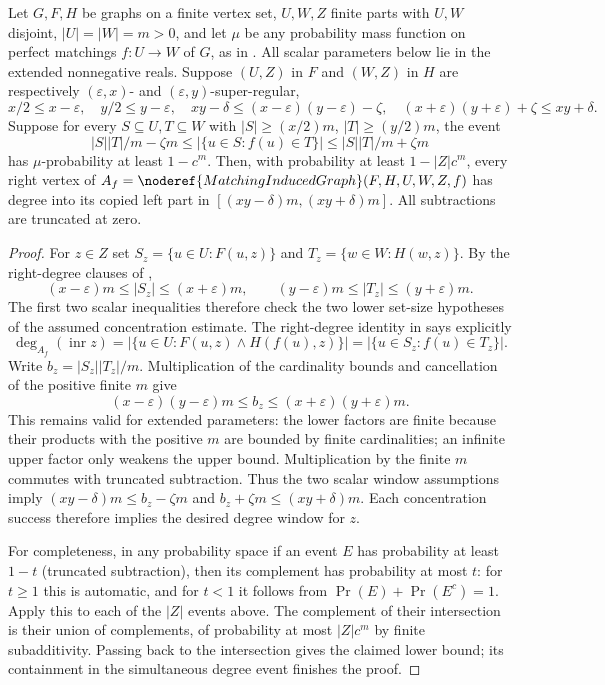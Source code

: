 \begin{lemma}
Let $G,F,H$ be graphs on a finite vertex set, $U,W,Z$ finite parts with $U,W$ disjoint,
$|U|=|W|=m>0$, and let $\mu$ be any probability mass function on perfect
matchings $f:U\to W$ of $G$, as in .
All scalar parameters below lie in the extended nonnegative reals.
Suppose $(U,Z)$ in $F$ and $(W,Z)$ in $H$ are respectively
$(\varepsilon,x)$- and $(\varepsilon,y)$-super-regular,
\[
 x/2\leq x-\varepsilon,\quad y/2\leq y-\varepsilon,\quad
 xy-\delta\leq(x-\varepsilon)(y-\varepsilon)-\zeta,\quad
 (x+\varepsilon)(y+\varepsilon)+\zeta\leq xy+\delta.
\]
Suppose for every $S\subseteq U,T\subseteq W$ with
$|S|\geq(x/2)m$, $|T|\geq(y/2)m$, the event
\[
 |S||T|/m-\zeta m\leq |\{u\in S:f(u)\in T\}|
 \leq |S||T|/m+\zeta m
\]
has $\mu$-probability at least $1-c^m$.
Then, with probability at least $1-|Z|c^m$, every right vertex of
$A_f=\noderef{MatchingInducedGraph}(F,H,U,W,Z,f)$ has degree into its
copied left part in $[(xy-\delta)m,(xy+\delta)m]$.
All subtractions are truncated at zero.
\end{lemma}
\begin{proof}
For $z\in Z$ set $S_z=\{u\in U:F(u,z)\}$ and
$T_z=\{w\in W:H(w,z)\}$. By the right-degree clauses of
,
\[
 (x-\varepsilon)m\leq|S_z|\leq(x+\varepsilon)m,\qquad
 (y-\varepsilon)m\leq|T_z|\leq(y+\varepsilon)m.
\]
The first two scalar inequalities therefore check the two lower set-size
hypotheses of the assumed concentration estimate. The right-degree
identity in  says explicitly
\[
 \deg_{A_f}(\operatorname{inr}z)
 =|\{u\in U:F(u,z)\land H(f(u),z)\}|
 =|\{u\in S_z:f(u)\in T_z\}|.
\]
Write $b_z=|S_z||T_z|/m$. Multiplication of the cardinality bounds and
cancellation of the positive finite $m$ give
\[
 (x-\varepsilon)(y-\varepsilon)m\leq b_z
 \leq(x+\varepsilon)(y+\varepsilon)m.
\]
This remains valid for extended parameters: the lower factors are finite
because their products with the positive $m$ are bounded by finite
cardinalities; an infinite upper factor only weakens the upper bound.
Multiplication by the finite $m$ commutes with truncated subtraction.
Thus the two scalar window assumptions imply
$(xy-\delta)m\leq b_z-\zeta m$ and
$b_z+\zeta m\leq(xy+\delta)m$. Each concentration success therefore
implies the desired degree window for $z$.

For completeness, in any probability space if an event $E$ has probability
at least $1-t$ (truncated subtraction), then its complement has probability
at most $t$: for $t\geq1$ this is automatic, and for $t<1$ it follows
from $\Pr(E)+\Pr(E^c)=1$. Apply this to each of the $|Z|$ events above.
The complement of their intersection is their union of complements, of
probability at most $|Z|c^m$ by finite subadditivity. Passing back to the
intersection gives the claimed lower bound; its containment in the
simultaneous degree event finishes the proof.
\end{proof}
